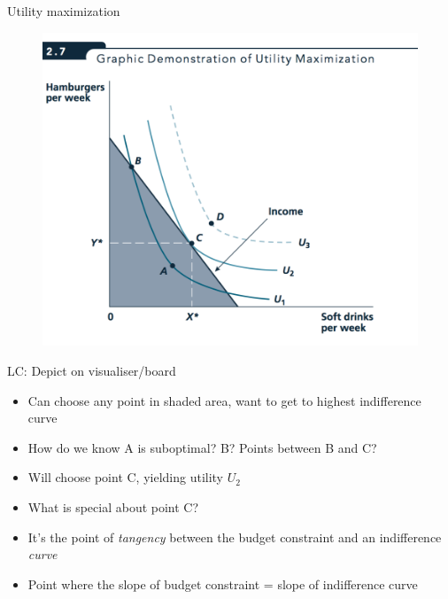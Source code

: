 \documentclass[table]{beamer}
\begin{document}
\begin{frame}{Utility maximization}
\protect\hypertarget{utility-maximization}{}

\begin{figure}

{\centering \includegraphics[width=0.75\linewidth]{picsfigs/utilmax} 

}

\end{figure}

LC: Depict on visualiser/board

\begin{itemize}
\item
  Can choose any point in shaded area, want to get to highest
  indifference curve\\
\item
  How do we know A is suboptimal? B? Points between B and C?
\item
  Will choose point C, yielding utility \(U_2\)\\
\item
  What is special about point C?\\
\item
  It's the point of \emph{tangency} between the budget constraint and an
  indifference \emph{curve}\\
\item
  Point where the slope of budget constraint = slope of indifference
  curve
\end{itemize}

\end{frame}
\end{document}
